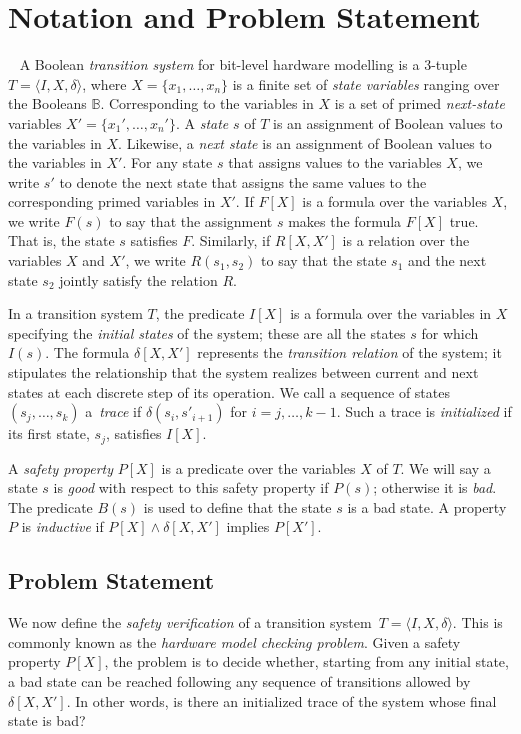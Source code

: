 \section{Notation and Problem Statement}~\label{sec:notation}
%
A Boolean \textit{transition system} for bit-level hardware
modelling is a 3-tuple $T = \langle I,X,\delta \rangle$, where $X = \{x_1,\dots ,x_n\}$
is a finite set of \textit{state variables} ranging over the Booleans $\mathbb{B}$. 
Corresponding to the variables in $X$ is a set of primed \textit{next-state} variables  $X' = \{x_1', \dots, x_n'\}$.
A \textit{state} $s$ of $T$ is an assignment of Boolean values to the variables in $X$. Likewise, a \textit{next state} is an assignment of Boolean values to the variables in $X'$.  For any state $s$ that assigns values to the  variables $X$, we write $s'$ to denote the next state that assigns the same values to the corresponding primed variables in $X'$. If $F[X]$ is a formula over the variables $X$, we write $F(s)$ to say that
the assignment $s$ makes the formula $F[X]$ true. That is, the state $s$ satisfies $F$. Similarly, if $R[X,X']$ is a relation over the variables $X$ and $X'$, we write $R(s_1,s_2)$ to say that the state $s_1$ and the next state $s_2$ jointly satisfy the relation $R$.

In a transition system $T$, the predicate $I[X]$ is a formula over the variables in 
$X$ specifying the \textit{initial states} of the system; these are all the states 
$s$ for which $I(s)$. The formula $\delta[X,X']$ represents the \textit{transition relation} of the system; it stipulates the relationship that the system
realizes between current and next states at each discrete step of its operation.
We call a sequence of states $(s_j,\dots,s_k)$ a~\textit{trace}
if $\delta(s_i,s'_{i{+}1})$ for $i=j,\dots,k-1$.  Such a trace is
\textit{initialized} if its first state, $s_j$, satisfies $I[X]$.
  
A \textit{safety property} $P[X]$ is a predicate over the variables $X$ of $T$.  We will 
say a state $s$ is \textit{good} with respect to this safety property if $P(s)$; otherwise it is \textit{bad}. The predicate $B(s)$ is used to define that the state $s$ is a bad 
state. A property $P$ is \textit{inductive} if $P[X] \wedge \delta[X,X']$ implies $P[X']$.    

%

\subsection{Problem Statement} 
%
We now define the \textit{safety verification} of a transition system~$T = \langle I,X,\delta\rangle$.
This is commonly known as the \textit{hardware model checking problem}.  
Given a safety property $P[X]$, the problem is to decide whether, starting from any initial state, a bad state can be reached following any sequence of transitions allowed by $\delta[X,X']$. In other words, is there an initialized trace of the system whose final state is bad?

